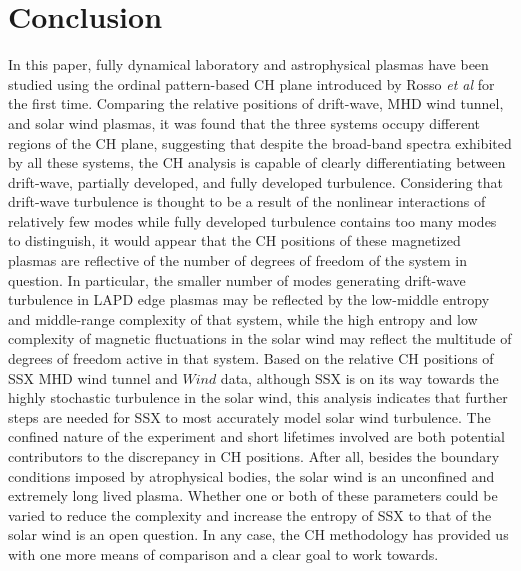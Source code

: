 \documentclass[aps,twocolumn,secnumarabic,nobalancelastpage,amsmath,amssymb,
nofootinbib]{revtex4-1}
\begin{document}
\section{Conclusion}
In this paper, fully dynamical laboratory and astrophysical plasmas have been studied using the ordinal pattern-based CH plane introduced by Rosso \textit{et al} for the first time. Comparing the relative positions of drift-wave, MHD wind tunnel, and solar wind plasmas, it was found that the three systems occupy different regions of the CH plane, suggesting that despite the broad-band spectra exhibited by all these systems, the CH analysis is capable of clearly differentiating between drift-wave, partially developed, and fully developed turbulence. Considering that drift-wave turbulence is thought to be a result of the nonlinear interactions of relatively few modes while fully developed turbulence contains too many modes to distinguish, it would appear that the CH positions of these magnetized plasmas are reflective of the number of degrees of freedom of the system in question. In particular, the smaller number of modes generating drift-wave turbulence in LAPD edge plasmas may be reflected by the low-middle entropy and middle-range complexity of that system, while the high entropy and low complexity of magnetic fluctuations in the solar wind may reflect the multitude of degrees of freedom active in that system. Based on the relative CH positions of SSX MHD wind tunnel and $\textit{Wind}$ data, although SSX is on its way towards the highly stochastic turbulence in the solar wind, this analysis indicates that further steps are needed for SSX  to most accurately model solar wind turbulence. The confined nature of the experiment and short lifetimes involved are both potential contributors to the discrepancy in CH positions. After all, besides the boundary conditions imposed by atrophysical bodies, the solar wind is an unconfined and extremely long lived plasma. Whether one or both of these parameters could be varied to reduce the complexity and increase the entropy of SSX to that of the solar wind is an open question. In any case, the CH methodology has provided us with one more means of comparison and a clear goal to work towards.





\nocite{*}
\end{document}
